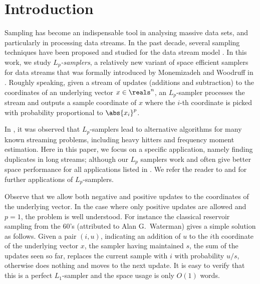 
\section{Introduction}
\label{sec:intro}
Sampling has become an indispensable tool in analysing massive
data sets, and particularly in processing data streams. In the
past decade, several sampling techniques have been proposed and
studied for the data stream model \cite{BabcockDM2002,
DuffieldLT2007, BravermanOZ2009, CormodeMYZ2010,
MonemizadehW2010, AndoniKO2010}. In this work, we study {\em
$L_p$-samplers}, a relatively new variant of space efficient
samplers for data streams that was formally introduced by
Monemizadeh and Woodruff in \cite{MonemizadehW2010}. Roughly
speaking, given a stream of updates (additions and subtraction)
to the coordinates of an underlying vector $x\in\reals^n$, an
$L_p$-sampler processes the stream and outputs a sample
coordinate of $x$ where the $i$-th coordinate is picked with
probability proportional to $\abs{x_i}^p$.

In \cite{MonemizadehW2010}, it was observed that $L_p$-samplers
lead to alternative algorithms for many known streaming
problems, including heavy hitters and frequency moment
estimation. Here in this paper, we focus on a specific
application, namely finding duplicates in long streams; although
our $L_p$ samplers work and often give better space performance
for all applications listed in \cite{MonemizadehW2010}. We refer
the reader to \cite{MonemizadehW2010} and \cite{AndoniKO2010}
for further applications of $L_p$-samplers.


Observe that we allow both negative and positive updates to the
coordinates of the underlying vector. In the case where only
positive updates are allowed and $p=1$, the problem is well
understood.
For instance the classical reservoir sampling \cite{Knuth1969}
from the 60's (attributed to Alan G.~Waterman) gives a simple
solution as follows. Given a pair $(i,u)$, indicating an
addition of $u$ to the $i$th coordinate of the underlying
vector $x$, the sampler having maintained $s$, the sum of the
updates seen so far, replaces the current sample with $i$ with
probability $u/s$, otherwise does nothing and moves to the next
update. It is easy to verify that this is a perfect
$L_1$-sampler and the space usage is only $O(1)$ words.
    
